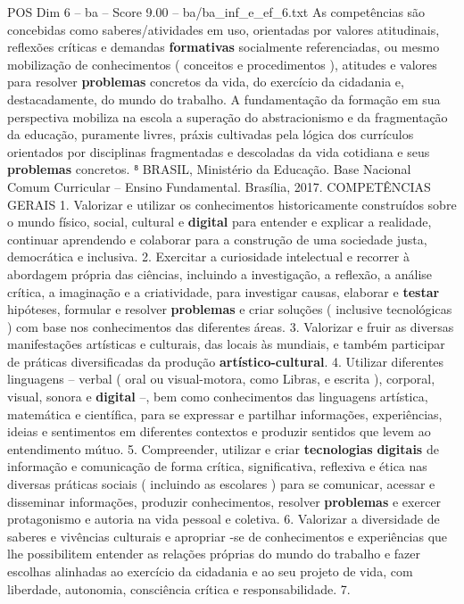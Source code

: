 \begin{textsample}{POS Dim 6 – ba – Score 9.00 – ba/ba\_inf\_e\_ef\_6.txt}
As competências são concebidas como saberes/atividades em uso, orientadas por valores atitudinais, reflexões críticas e demandas \textbf{formativas} socialmente referenciadas, ou mesmo mobilização de conhecimentos ( conceitos e procedimentos ), atitudes e valores para resolver \textbf{problemas} concretos da vida, do exercício da cidadania e, destacadamente, do mundo do trabalho.
A fundamentação da formação em sua perspectiva mobiliza na escola a superação do abstracionismo e da fragmentação da educação, puramente livres, práxis cultivadas pela lógica dos currículos orientados por disciplinas fragmentadas e descoladas da vida cotidiana e seus \textbf{problemas} concretos. ⁸ BRASIL, Ministério da Educação.
Base Nacional Comum Curricular – Ensino Fundamental.
Brasília, 2017.
COMPETÊNCIAS GERAIS 1.
Valorizar e utilizar os conhecimentos historicamente construídos sobre o mundo físico, social, cultural e \textbf{digital} para entender e explicar a realidade, continuar aprendendo e colaborar para a construção de uma sociedade justa, democrática e inclusiva. 2.
Exercitar a curiosidade intelectual e recorrer à abordagem própria das ciências, incluindo a investigação, a reflexão, a análise crítica, a imaginação e a criatividade, para investigar causas, elaborar e \textbf{testar} hipóteses, formular e resolver \textbf{problemas} e criar soluções ( inclusive tecnológicas ) com base nos conhecimentos das diferentes áreas. 3.
Valorizar e fruir as diversas manifestações artísticas e culturais, das locais às mundiais, e também participar de práticas diversificadas da produção \textbf{artístico-cultural}. 4.
Utilizar diferentes linguagens – verbal ( oral ou visual-motora, como Libras, e escrita ), corporal, visual, sonora e \textbf{digital} –, bem como conhecimentos das linguagens artística, matemática e científica, para se expressar e partilhar informações, experiências, ideias e sentimentos em diferentes contextos e produzir sentidos que levem ao entendimento mútuo. 5.
Compreender, utilizar e criar \textbf{tecnologias} \textbf{digitais} de informação e comunicação de forma crítica, significativa, reflexiva e ética nas diversas práticas sociais ( incluindo as escolares ) para se comunicar, acessar e disseminar informações, produzir conhecimentos, resolver \textbf{problemas} e exercer protagonismo e autoria na vida pessoal e coletiva. 6.
Valorizar a diversidade de saberes e vivências culturais e apropriar -se de conhecimentos e experiências que lhe possibilitem entender as relações próprias do mundo do trabalho e fazer escolhas alinhadas ao exercício da cidadania e ao seu projeto de vida, com liberdade, autonomia, consciência crítica e responsabilidade. 7.

\end{textsample}
